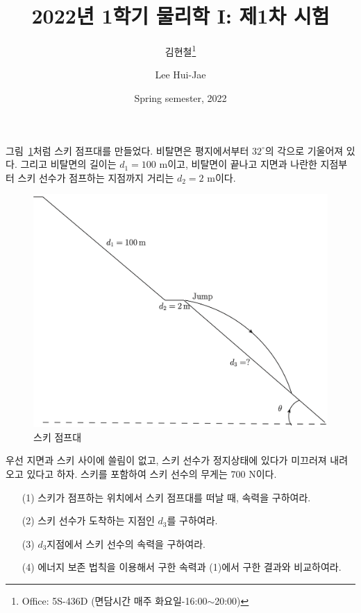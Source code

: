 \documentclass[floatfix,nofootinbib,superscriptaddress,fleqn]{revtex4-2}
\begin{document}
\title{\Large 2022년 1학기 물리학 I: 제1차 시험}
\author{김현철\footnote{Office: 5S-436D (면담시간 매주
    화요일-16:00$\sim$20:00)}} 
\author{Lee Hui-Jae} 
\date{Spring semester, 2022}


\maketitle

그림~\ref{fig:1}처럼 스키 점프대를 만들었다. 비탈면은 평지에서부터
$32^\circ$의 각으로 기울어져 있다. 그리고 비탈면의 길이는 $d_1=100$
m이고, 비탈면이 끝나고 지면과 나란한 지점부터 스키 선수가 점프하는
지점까지 거리는 $d_2=2$ m이다. 
\begin{figure}[ht]
  \centering
\includegraphics[scale=0.5]{Qfig9-20220330.png}  
  \caption{스키 점프대}
  \label{fig:1}
\end{figure}
우선 지면과 스키 사이에 쓸림이 없고, 스키 선수가 정지상태에 있다가 미끄러져
내려오고 있다고 하자. 스키를 포함하여 스키 선수의 무게는 700 N이다. 
\begin{itemize}
\item[(1)] 스키가 점프하는 위치에서 스키 점프대를 떠날 때, 속력을
  구하여라.
\item[(2)] 스키 선수가 도착하는 지점인 $d_3$를 구하여라.
\item[(3)] $d_3$지점에서 스키 선수의 속력을 구하여라.   
\item[(4)] 에너지 보존 법칙을 이용해서 구한 속력과 (1)에서 구한 결과와
  비교하여라. 
\end{itemize}
\end{document}
